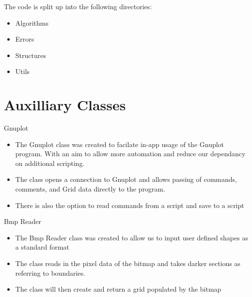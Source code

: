 \documentclass{beamer}
\begin{document}
\begin{frame}
   The code is split up into the following directories:
   \begin{itemize}
        \item Algorithms
        \item Errors
        \item Structures
        \item Utils
    \end{itemize}
\end{frame}

\section{Auxilliary Classes}

\begin{frame}{Gnuplot}
    \begin{itemize}
        \item The Gnuplot class was created to facilate in-app usage of the Gnuplot program. With an aim to allow more automation and reduce our dependancy on additional scripting.
        \item The class opens a connection to Gnuplot and allows passing of commands, comments, and Grid data directly to the program.
        \item There is also the option to read commands from a script and save to a script
    \end{itemize}
\end{frame}

\begin{frame}{Bmp Reader}
    \begin{itemize}
        \item The Bmp Reader class was created to allow us to input user defined shapes as a standard format
        \item The class reads in the pixel data of the bitmap and takes darker sections as referring to boundaries.
        \item The class will then create and return a grid populated by the bitmap
    \end{itemize}
\end{frame}
\end{document}
